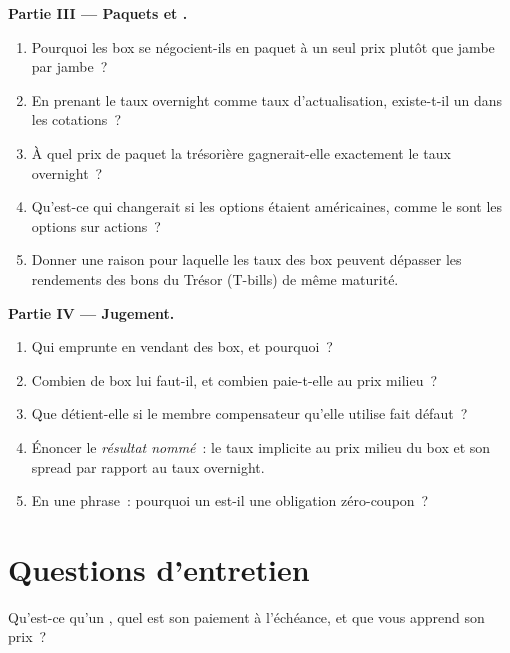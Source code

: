 \begin{problem}
\medskip\noindent\textbf{Partie III --- Paquets et .}
\begin{enumerate}[resume]
\item Pourquoi les box se négocient-ils en paquet à un seul prix plutôt que jambe par jambe~?
\item En prenant le taux overnight comme taux d'actualisation, existe-t-il un  dans les cotations~?
\item À quel prix de paquet la trésorière gagnerait-elle exactement le taux overnight~?
\item Qu'est-ce qui changerait si les options étaient américaines, comme le sont les options sur actions~?
\item Donner une raison pour laquelle les taux des box peuvent dépasser les rendements des bons du Trésor (T-bills) de même maturité.
\end{enumerate}

\medskip\noindent\textbf{Partie IV --- Jugement.}
\begin{enumerate}[resume]
\item Qui emprunte en vendant des box, et pourquoi~?
\item Combien de box lui faut-il, et combien paie-t-elle au prix milieu~?
\item Que détient-elle si le membre compensateur qu'elle utilise fait défaut~?
\item Énoncer le \emph{résultat nommé}~: le taux implicite au prix milieu du box et son spread par rapport au taux overnight.
\item En une phrase~: pourquoi un  est-il une obligation zéro-coupon~?
\end{enumerate}
\end{problem}

\section{Questions d'entretien}

\begin{interviewq}\label{iq:dv:no-arbitrage-and-the-fundamental-theorems:1}
Qu'est-ce qu'un , quel est son paiement à l'échéance, et que vous apprend son prix~?
\end{interviewq}

